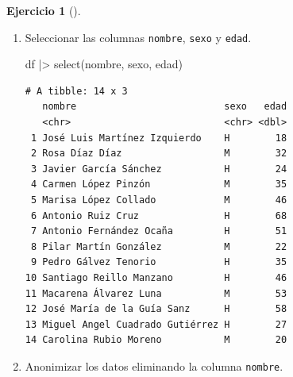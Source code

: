 \documentclass[
  a4paper,
]{scrreport}
\newenvironment{Shaded}{\begin{snugshade}}{\end{snugshade}}
\newcommand{\FunctionTok}[1]{\textcolor[rgb]{0.28,0.35,0.67}{#1}}
\newcommand{\NormalTok}[1]{\textcolor[rgb]{0.00,0.23,0.31}{#1}}
\newcommand{\SpecialCharTok}[1]{\textcolor[rgb]{0.37,0.37,0.37}{#1}}
\theoremstyle{definition}
\newtheorem{exercise}{Ejercicio}[chapter]
\theoremstyle{remark}
\begin{document}
\begin{exercise}[]
\begin{enumerate}
\begin{tcolorbox}
  \end{tcolorbox}
\item
  Seleccionar las columnas \texttt{nombre}, \texttt{sexo} y
  \texttt{edad}.

  \begin{tcolorbox}[enhanced jigsaw, toprule=.15mm, rightrule=.15mm, arc=.35mm, colback=white, colbacktitle=quarto-callout-tip-color!10!white, toptitle=1mm, left=2mm, colframe=quarto-callout-tip-color-frame, opacityback=0, breakable, opacitybacktitle=0.6, bottomtitle=1mm, titlerule=0mm, title=\textcolor{quarto-callout-tip-color}{\faLightbulb}\hspace{0.5em}{Solución}, bottomrule=.15mm, coltitle=black, leftrule=.75mm]

\begin{Shaded}
\begin{Highlighting}[]
\NormalTok{df }\SpecialCharTok{|\textgreater{}}
    \FunctionTok{select}\NormalTok{(nombre, sexo, edad)}
\end{Highlighting}
\end{Shaded}

\begin{verbatim}
# A tibble: 14 x 3
   nombre                          sexo   edad
   <chr>                           <chr> <dbl>
 1 José Luis Martínez Izquierdo    H        18
 2 Rosa Díaz Díaz                  M        32
 3 Javier García Sánchez           H        24
 4 Carmen López Pinzón             M        35
 5 Marisa López Collado            M        46
 6 Antonio Ruiz Cruz               H        68
 7 Antonio Fernández Ocaña         H        51
 8 Pilar Martín González           M        22
 9 Pedro Gálvez Tenorio            H        35
10 Santiago Reillo Manzano         H        46
11 Macarena Álvarez Luna           M        53
12 José María de la Guía Sanz      H        58
13 Miguel Angel Cuadrado Gutiérrez H        27
14 Carolina Rubio Moreno           M        20
\end{verbatim}

  \end{tcolorbox}
\item
  Anonimizar los datos eliminando la columna \texttt{nombre}.

  \begin{tcolorbox}[enhanced jigsaw, toprule=.15mm, rightrule=.15mm, arc=.35mm, colback=white, colbacktitle=quarto-callout-tip-color!10!white, toptitle=1mm, left=2mm, colframe=quarto-callout-tip-color-frame, opacityback=0, breakable, opacitybacktitle=0.6, bottomtitle=1mm, titlerule=0mm, title=\textcolor{quarto-callout-tip-color}{\faLightbulb}\hspace{0.5em}{Solución}, bottomrule=.15mm, coltitle=black, leftrule=.75mm]


\end{tcolorbox}
\end{enumerate}
\end{exercise}
\end{document}
